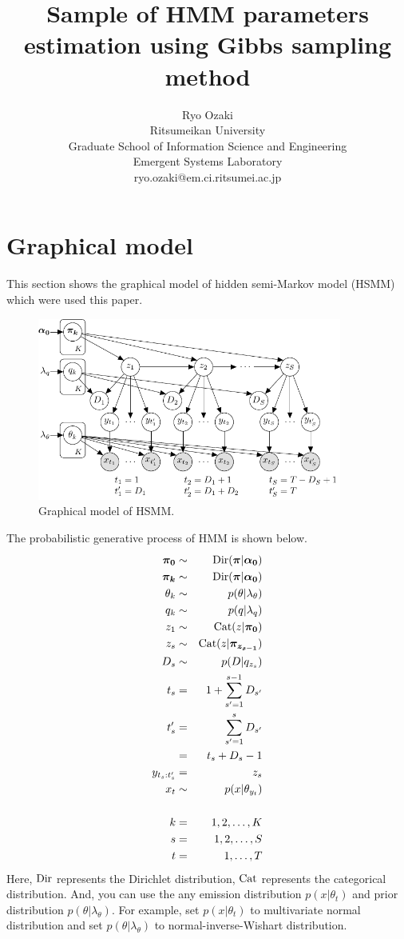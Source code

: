 \documentclass[a4paper]{article}
\title{Sample of HMM parameters estimation using Gibbs sampling method}
\author{
	Ryo Ozaki\\
	Ritsumeikan University\\
	Graduate School of Information Science and Engineering\\
	Emergent Systems Laboratory\\
	ryo.ozaki@em.ci.ritsumei.ac.jp
}
\DeclareMathOperator{\Cat}{\rm Cat}
\DeclareMathOperator{\Dir}{\rm Dir}
\begin{document}
	\maketitle
	\section{Graphical model}
	This section shows the graphical model of hidden semi-Markov model (HSMM) which were used this paper.
	\begin{figure}[ht]
		\begin{center}
			\includegraphics[width=10cm]{fig/HSMM_graphical_model.pdf}
			\caption{Graphical model of HSMM.}
		\end{center}
	\end{figure}

	The probabilistic generative process of HMM is shown below.
	\begin{eqnarray}
		\boldsymbol{\pi_0} &\sim& \Dir(\boldsymbol{\pi} | \boldsymbol{\alpha_0}) \\
		\boldsymbol{\pi_{k}} &\sim& \Dir(\boldsymbol{\pi} | \boldsymbol{\alpha_0}) \\
		\theta_k &\sim& p(\theta | \lambda_\theta) \\
		q_k &\sim& p(q | \lambda_q) \\
		z_1 &\sim& \Cat(z | \boldsymbol{\pi_0})\\
		z_s &\sim& \Cat(z | \boldsymbol{\pi_{z_{s-1}}})\\
		D_s &\sim& p(D | q_{z_s}) \\
		t_s &=& 1 + \sum_{s'=1}^{s-1}{D_{s'}} \\
		t'_s &=& \sum_{s'=1}^{s}{D_{s'}} \\
		&=& t_s + D_s - 1 \\
		y_{t_s:t'_s} &=& z_s \\
		x_t  &\sim& p(x | \theta_{y_t})\\
		\nonumber \\
		k &=& 1, 2, \ldots, K \\
		s &=& 1, 2, \ldots, S \\
		t &=& 1, \ldots, T
	\end{eqnarray}
	Here, $\Dir$ represents the Dirichlet distribution, $\Cat$ represents the categorical distribution.
	And, you can use the any emission distribution $p(x | \theta_{t})$ and prior  distribution $p(\theta | \lambda_\theta)$.
	For example, set $p(x | \theta_{t})$ to multivariate normal distribution and set $p(\theta | \lambda_\theta)$ to normal-inverse-Wishart distribution.
\end{document}
